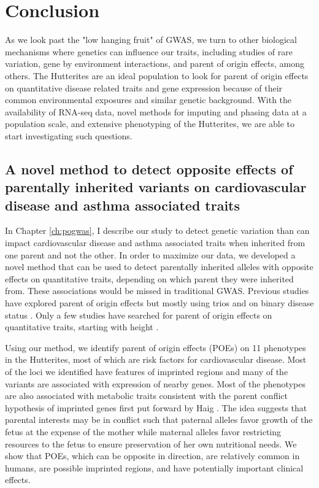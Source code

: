 \chapter{Conclusion}

As we look past the "low hanging fruit" of GWAS, we turn to other biological mechanisms where genetics can influence our traits, including studies of rare variation\citep{Igartua:2017ir,Li:2017bq}, gene by environment interactions, and parent of origin effects, among others. The Hutterites are an ideal population to look for parent of origin effects on quantitative disease related traits and gene expression because of their common environmental exposures and similar genetic background\cite{Weiss:2005cq,Abney2001,Ober:2001dy}. With the availability of RNA-seq data, novel methods for imputing and phasing data at a population scale\citep {Livne2015}, and extensive phenotyping of the Hutterites, we are able to start investigating such questions. 


\section{A novel method to detect opposite effects of parentally inherited variants on cardiovascular disease and asthma associated traits}
 
 In Chapter \ref{ch:pogwas}, I describe our study to detect genetic variation than can impact cardiovascular disease and asthma associated traits when inherited from one parent and not the other. In order to maximize our data, we developed a novel method that can be used to detect parentally inherited alleles with opposite effects on quantitative traits, depending on which parent they were inherited from. These associations would be missed in traditional GWAS. Previous studies have explored parent of origin effects but mostly using trios \cite{Garg2012a,Ainsworth:2010bp,Howey:2012hj} and on binary disease status \cite{Kong:2009kk,Ainsworth:2010bp}. Only a few studies have searched for parent of origin effects on quantitative traits, starting with height \cite{Benonisdottir:2016dz,Zoledziewska:2015do}.
 
Using our method, we identify parent of origin effects (POEs) on 11 phenotypes in the Hutterites, most of which are risk factors for cardiovascular disease. Most of the loci we identified have features of imprinted regions and many of the variants are associated with expression of nearby genes. Most of the phenotypes are also associated with metabolic traits consistent with the parent conflict hypothesis of imprinted genes first put forward by Haig \citep{Haig:2000if,Barlow:2014dv,Patten:2016cb}. The idea suggests that parental interests may be in conflict such that paternal alleles favor growth of the fetus at the expense of the mother while maternal alleles favor restricting resources to the fetus to ensure preservation of her own nutritional needs. We show that POEs, which can be opposite in direction, are relatively common in humans, are possible imprinted regions, and have potentially important clinical effects. 
 

